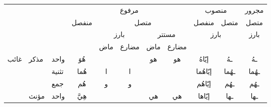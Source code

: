 \documentclass[../main.tex]{subfiles}
\begin{document}
\begin{table}[H]
\centering
\begin{tabular}{lll|ccccc|cc|c|}
\cline{4-11}
                                            &                                            &       & \multicolumn{5}{c|}{مرفوع}                                                                                                                & \multicolumn{2}{c|}{منصوب}              & مجرور  \\ \cline{4-11} 
                                            &                                            &       & \multicolumn{1}{c|}{\multirow{3}{*}{منفصل}} & \multicolumn{4}{c|}{متصل}                                                                   & \multicolumn{1}{c|}{منفصل}     & متصل   & متصل   \\ \cline{5-11} 
                                            &                                            &       & \multicolumn{1}{c|}{}                       & \multicolumn{2}{c|}{بارز}                                & \multicolumn{2}{c|}{مستتر}       & \multicolumn{2}{c|}{بارز}               & بارز   \\ \cline{5-11} 
                                            &                                            &       & \multicolumn{1}{c|}{}                       & \multicolumn{1}{c|}{ماض}    & \multicolumn{1}{c|}{مضارع} & \multicolumn{1}{c|}{ماض} & مضارع &                                &        &        \\ \hline
\multicolumn{1}{|l|}{\multirow{6}{*}{غائب}} & \multicolumn{1}{l|}{\multirow{3}{*}{مذكر}} & واحد  & \multicolumn{1}{c|}{هُوَ}                   & \multicolumn{1}{c|}{}       & \multicolumn{1}{c|}{}      & \multicolumn{1}{c|}{هو}  & هو    & \multicolumn{1}{c|}{إيّاهُ}    & ـهُ    & ـهُ    \\ \cline{3-11} 
\multicolumn{1}{|l|}{}                      & \multicolumn{1}{l|}{}                      & تثنية & \multicolumn{1}{c|}{هُما}                   & \multicolumn{1}{c|}{ا}      & \multicolumn{1}{c|}{ا}     & \multicolumn{1}{c|}{}    &       & \multicolumn{1}{c|}{إيّاهُما}  & ـهُما  & ـهُما  \\ \cline{3-11} 
\multicolumn{1}{|l|}{}                      & \multicolumn{1}{l|}{}                      & جمع   & \multicolumn{1}{c|}{هُم}                    & \multicolumn{1}{c|}{و}      & \multicolumn{1}{c|}{و}     & \multicolumn{1}{c|}{}    &       & \multicolumn{1}{c|}{إيّاهُم}   & ـهُم   & ـهُم   \\ \cline{2-11} 
\multicolumn{1}{|l|}{}                      & \multicolumn{1}{l|}{\multirow{3}{*}{مؤنث}} & واحد  & \multicolumn{1}{c|}{هِيَّ}                  & \multicolumn{1}{c|}{}       & \multicolumn{1}{c|}{}      & \multicolumn{1}{c|}{هي}  & هي    & \multicolumn{1}{c|}{إيّاها}    & ـها    & ـها    \\ \cline{3-11} 

\end{tabular}
\end{table}
\end{document}
